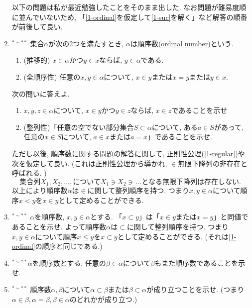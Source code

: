 \documentclass[dvipdfmx,a4paper,11pt]{article}
\theoremstyle{definition}
\begin{document}
\begin{enumerate}[label=\textbf{問}\ref*{sec-1}.\arabic*]
\medskip
以下の問題は私が最近勉強したことをそのまま出した. %
なお問題が難易度順に並んでいないため, 「\ref{1-ordinal}を仮定して\ref{1-suc}を解く」など解答の順番が前後して良い. 
 
\item $^{* \sim **}$ \label{1-ordinal}集合$\alpha$が次の2つを満たすとき, $\alpha$は\underline{順序数(ordinal number)}という. 
\begin{enumerate}[label=(\alph*).]
 \setlength{\parskip}{0cm}
  \setlength{\itemsep}{0pt}
\item (推移的) $x \in \alpha$かつ$y \in x$ならば, $y \in \alpha$である. 
\item (全順序性) 任意の$x,y \in \alpha$について, $x \in y$または$x=y$または$y \in x$.
  \end{enumerate}
  次の問いに答えよ.
  \begin{enumerate}[label=(\arabic*).]
 \setlength{\parskip}{0cm}
  \setlength{\itemsep}{0pt}
  \item $x,y,z \in \alpha$について, $x \in y$かつ$y \in z$ならば, $x \in z$であることを示せ
 \item (整列性)「任意の空でない部分集合$S \subset \alpha$について, ある$a\in S$があって, 任意の$x \in S$について, $a \in x$または$a=x$」であることを示せ.
  \end{enumerate}
 ただし以後, 順序数に関する問題の解答に関して, 正則性公理(\ref{1-regular})や次を仮定して良い. (これは正則性公理から導かれ, $\in$無限下降列の非存在と呼ばれる. )
 $$
 \text{集合列$X_1, X_2, \ldots, $について$X_1\ni X_2\ni \, \ldots $となる無限下降列は存在しない. }
 $$
以上により順序数$\alpha$は$\in$に関して整列順序を持つ. 
つまり$x,y \in \alpha$について順序$x < y$を$x \in y$として定めることができる. 
 
 \item $^{* \sim **}$ $\alpha$を順序数, $x,y \in \alpha$とする. 「$x \subset y$」は「$x \in y$または$x = y$」と同値であることを示せ.
  よって順序数$\alpha$は$\subset$に関して整列順序を持つ. 
つまり$x,y \in \alpha$について順序$x \le y$を$x \subset y$として定めることができる.  (それは\ref{1-ordinal}の順序と同じである.)

 \item $^{* \sim **}$$\alpha$を順序数とする. 任意の$\beta \in \alpha$について$\beta$もまた順序数であることを示せ.

 
 \item $^{* \sim **}$ 順序数$\alpha, \beta$について$\alpha \subset \beta$または$\beta \subset \alpha$が成り立つことを示せ.
 (つまり$\alpha \in \beta, \alpha=\beta, \beta \in \alpha$のどれかが成り立つ.)
 

\end{enumerate}
\end{document}
